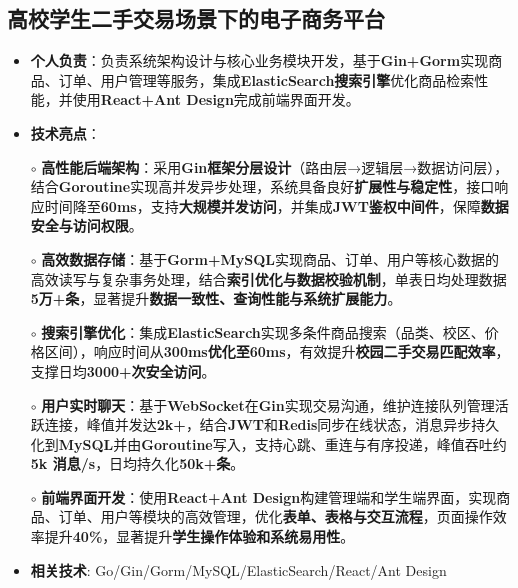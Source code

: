 \subsection{\textbf{高校学生二手交易场景下的电子商务平台} \hspace{2cm}{2024.10 -- 2024.12}}
  \begin{normalsize}
    \begin{itemize}
  \item \textbf{个人负责}：负责系统架构设计与核心业务模块开发，基于\textbf{Gin+Gorm}实现商品、订单、用户管理等服务，集成\textbf{ElasticSearch搜索引擎}优化商品检索性能，并使用\textbf{React+Ant Design}完成前端界面开发。
  \item \textbf{技术亮点}：
    \setlength{\itemindent}{1em} %
  \item[$\circ$] \textbf{高性能后端架构}：采用\textbf{Gin框架分层设计}（路由层→逻辑层→数据访问层），结合\textbf{Goroutine}实现高并发异步处理，系统具备良好\textbf{扩展性与稳定性}，接口响应时间降至\textbf{60ms}，支持\textbf{大规模并发访问}，并集成\textbf{JWT鉴权中间件}，保障\textbf{数据安全与访问权限}。
  \item[$\circ$] \textbf{高效数据存储}：基于\textbf{Gorm+MySQL}实现商品、订单、用户等核心数据的高效读写与复杂事务处理，结合\textbf{索引优化与数据校验机制}，单表日均处理数据\textbf{5万+条}，显著提升\textbf{数据一致性、查询性能与系统扩展能力}。
  \item[$\circ$] \textbf{搜索引擎优化}：集成\textbf{ElasticSearch}实现多条件商品搜索（品类、校区、价格区间），响应时间从\textbf{300ms优化至60ms}，有效提升\textbf{校园二手交易匹配效率}，支撑日均\textbf{3000+次安全访问}。
  \item[$\circ$] \textbf{用户实时聊天}：基于\textbf{WebSocket}在\textbf{Gin}实现交易沟通，维护连接队列管理活跃连接，峰值并发达\textbf{2k+}，结合\textbf{JWT}和\textbf{Redis}同步在线状态，消息异步持久化到\textbf{MySQL}并由\textbf{Goroutine}写入，支持心跳、重连与有序投递，峰值吞吐约\textbf{5k 消息/s}，日均持久化\textbf{50k+条}。
  \item[$\circ$] \textbf{前端界面开发}：使用\textbf{React+Ant Design}构建管理端和学生端界面，实现商品、订单、用户等模块的高效管理，优化\textbf{表单、表格与交互流程}，页面操作效率提升\textbf{40\%}，显著提升\textbf{学生操作体验和系统易用性}。
    \setlength{\itemindent}{0em} %
    \item \textbf{相关技术}: Go/Gin/Gorm/MySQL/ElasticSearch/React/Ant Design
    \end{itemize}
  \end{normalsize}